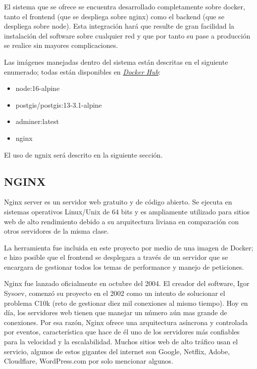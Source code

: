 El sistema que se ofrece se encuentra desarrollado completamente sobre docker, tanto el frontend (que se despliega sobre nginx) como el backend (que se despliega sobre node). Esta integración hará que resulte de gran facilidad la instalación del software sobre cualquier red y que por tanto su pase a producción se realice sin mayores complicaciones. 

Las imágenes manejadas dentro del sistema están descritas en el siguiente enumerado; todas están disponibles en \href{https://hub.docker.com/}{\textit{Docker Hub}}:
\begin{itemize}
	\item node:16-alpine
	\item postgis/postgis:13-3.1-alpine
	\item adminer:latest
	\item nginx
\end{itemize}

El uso de ngnix será descrito en la siguiente sección.

\subsection{NGINX}

Nginx server es un servidor web gratuito y de código abierto. Se ejecuta en sistemas operativos Linux/Unix de 64 bits y es ampliamente utilizado para sitios web de alto rendimiento debido a su arquitectura liviana en comparación con otros servidores de la misma clase.

La herramienta fue incluida en este proyecto por medio de una imagen de Docker; e hizo posible que el frontend se desplegara a través de un servidor que se encargara de gestionar todos los temas de performance y manejo de peticiones.

Nginx fue lanzado oficialmente en octubre del 2004. El creador del software, Igor Sysoev, comenzó su proyecto en el 2002 como un intento de solucionar el problema C10k (reto de gestionar diez mil conexiones al mismo tiempo). Hoy en día, los servidores web tienen que manejar un número aún mas grande de conexiones. Por esa razón, Nginx ofrece una arquitectura asíncrona y controlada por eventos, característica que hace de él uno de los servidores más confiables para la velocidad y la escalabilidad. Muchos sitios web de alto tráfico usan el servicio, algunos de estos gigantes del internet son Google, Netflix, Adobe, Cloudflare, WordPress.com por solo mencionar algunos. \cite{nginx}


